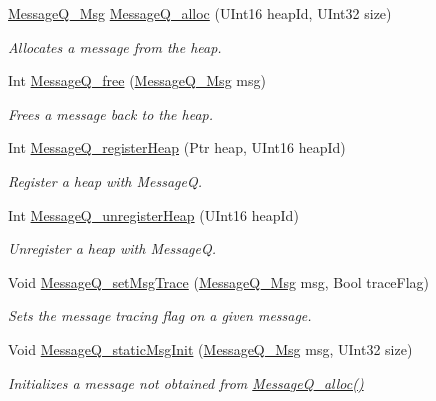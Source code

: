 \begin{DoxyCompactItemize}
\hyperlink{_message_q_8h_ab675d3cdd0443a1ad05658d375458204}{Message\-Q\-\_\-\-Msg} \hyperlink{_message_q_8h_ad8de6381a05a4d8a672d06a3b5676a24}{Message\-Q\-\_\-alloc} (U\-Int16 heap\-Id, U\-Int32 size)
\begin{DoxyCompactList}\small\item\em Allocates a message from the heap. \end{DoxyCompactList}\item 
Int \hyperlink{_message_q_8h_ac7ac95bf02e7366b353e728b15d76852}{Message\-Q\-\_\-free} (\hyperlink{_message_q_8h_ab675d3cdd0443a1ad05658d375458204}{Message\-Q\-\_\-\-Msg} msg)
\begin{DoxyCompactList}\small\item\em Frees a message back to the heap. \end{DoxyCompactList}\item 
Int \hyperlink{_message_q_8h_ab74ba85e9c7ebbb1a888df871fd2a6c6}{Message\-Q\-\_\-register\-Heap} (Ptr heap, U\-Int16 heap\-Id)
\begin{DoxyCompactList}\small\item\em Register a heap with Message\-Q. \end{DoxyCompactList}\item 
Int \hyperlink{_message_q_8h_a4258fb35928047e54b625009c86ec4ba}{Message\-Q\-\_\-unregister\-Heap} (U\-Int16 heap\-Id)
\begin{DoxyCompactList}\small\item\em Unregister a heap with Message\-Q. \end{DoxyCompactList}\item 
Void \hyperlink{_message_q_8h_a74dc311c0b89f6fcbb309a5a98ab349f}{Message\-Q\-\_\-set\-Msg\-Trace} (\hyperlink{_message_q_8h_ab675d3cdd0443a1ad05658d375458204}{Message\-Q\-\_\-\-Msg} msg, Bool trace\-Flag)
\begin{DoxyCompactList}\small\item\em Sets the message tracing flag on a given message. \end{DoxyCompactList}\item 
Void \hyperlink{_message_q_8h_a5b627fa66c267f53cccb0a960fe23a64}{Message\-Q\-\_\-static\-Msg\-Init} (\hyperlink{_message_q_8h_ab675d3cdd0443a1ad05658d375458204}{Message\-Q\-\_\-\-Msg} msg, U\-Int32 size)
\begin{DoxyCompactList}\small\item\em Initializes a message not obtained from \hyperlink{_message_q_8h_ad8de6381a05a4d8a672d06a3b5676a24}{Message\-Q\-\_\-alloc()} \end{DoxyCompactList}\item 

\end{DoxyCompactItemize}
